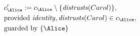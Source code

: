 \begin{align*}
&
c'_
{
\Alice
}
 := 
c_
{
\Alice
}
 \setminus 
\{
\mathit{\detokenize{
distrusts
}}
(
Carol
)
\}
,\\
&
\text{provided } 
\mathit{\detokenize{
identity
}}
,
\mathit{\detokenize{
distrusts
}}
(
Carol
)
 \in c_
{
\Alice
}
,\\
&
\text{guarded by } \{
\Alice
\}
\end{align*}
